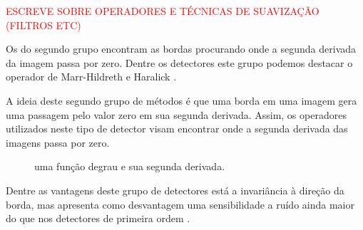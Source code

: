 \textcolor{red}{ESCREVE SOBRE OPERADORES E TÉCNICAS DE SUAVIZAÇÃO (FILTROS ETC)}

Os do segundo grupo encontram as bordas procurando onde a segunda derivada da imagem passa por zero. Dentre os detectores este grupo podemos destacar o operador de Marr-Hildreth \cite{marr} e Haralick \cite{haralick}.

A ideia deste segundo grupo de métodos é que uma borda em uma imagem gera uma passagem pelo valor zero em sua segunda derivada. Assim, os operadores utilizados neste tipo de detector visam encontrar onde a segunda derivada das imagens passa por zero.


\begin{figure}[h]
  \centering
  \hfill
  \caption{uma função degrau e sua segunda derivada.}
  \label{dif}
\end{figure}

Dentre as vantagens deste grupo de detectores está a invariância à direção da borda, mas apresenta como desvantagem uma sensibilidade a ruído ainda maior do que nos detectores de primeira ordem \cite{comparaborda}.

